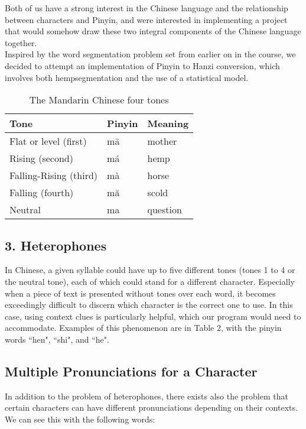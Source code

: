 \documentclass[11pt, twocolumn]{article}
\makeatletter
\newenvironment{problem x}{\@startsection
       {section}
       {1}
       {-.2em}
       {-3.5ex plus -1ex minus -.2ex}
       {2.3ex plus .2ex}
       {\pagebreak[3] %
       \large\bf\noindent{Problem }
       }
       }
       {%
       \begin{center}\large\bf \ldots\ldots\ldots\end{center}}
\makeatother
\begin{document}
Both of us have a strong interest in the Chinese language and the relationship between characters and Pinyin, and were interested in implementing a project that would somehow draw these two integral components of the Chinese language together.\\

Inspired by the word segmentation problem set from earlier on in the course, we decided to attempt an implementation of Pinyin to Hanzi conversion, which involves both hempsegmentation and the use of a statistical model.

\begin{table}
    \begin{centering}
        \begin{tabular}{|l|l|l|} \hline
        Tone   & Pinyin & Meaning \\ \hline
        Flat or level (first)  & m\={a} & mother \\ 
        Rising (second) & m\'{a} & hemp\\
        Falling-Rising (third) & m\`{a} & horse\\
        Falling (fourth) & m\u{a} & scold \\ 
        Neutral & m{a} & question\\ \hline
        \end{tabular}
        \caption{The Mandarin Chinese four tones}
    \end{centering}
\end{table}

\subsection*{3. Heterophones}

In Chinese, a given syllable could have up to five different tones (tones 1 to 4 or the neutral tone), each of which could stand for a different character. Especially when a piece of text is presented without tones over each word, it becomes exceedingly difficult to discern which character is the correct one to use. In this case, using context clues is particularly helpful, which our program would need to accommodate. Examples of this phenomenon are in Table 2, with the pinyin words ``hen", ``shi", and ``he".\\

\subsection{Multiple Pronunciations for a Character}
In addition to the problem of heterophones, there exists also the problem that certain characters can have different pronunciations depending on their contexts. We can see this with the following words:
\end{document}
